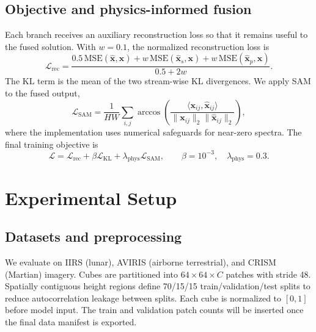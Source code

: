 \documentclass{article}
\newcommand{\sam}{\mathrm{SAM}}
\begin{document}
\subsection{Objective and physics-informed fusion}

Each branch receives an auxiliary reconstruction loss so that it remains useful to the fused solution. With $w=0.1$, the normalized reconstruction loss is
\begin{equation}
\mathcal{L}_{\mathrm{rec}}=
\frac{0.5\,\mathrm{MSE}(\hat{\mathbf{x}},\mathbf{x})+
w\,\mathrm{MSE}(\hat{\mathbf{x}}_s,\mathbf{x})+
w\,\mathrm{MSE}(\hat{\mathbf{x}}_p,\mathbf{x})}{0.5+2w}.
\end{equation}
The KL term is the mean of the two stream-wise KL divergences. We apply SAM to the fused output,
\begin{equation}
\mathcal{L}_{\sam}=\frac{1}{HW}\sum_{i,j}
\arccos\left(
\frac{\langle\mathbf{x}_{ij},\hat{\mathbf{x}}_{ij}\rangle}
{\lVert\mathbf{x}_{ij}\rVert_2\lVert\hat{\mathbf{x}}_{ij}\rVert_2}
\right),
\end{equation}
where the implementation uses numerical safeguards for near-zero spectra. The final training objective is
\begin{equation}
\mathcal{L}=\mathcal{L}_{\mathrm{rec}}+\beta\mathcal{L}_{\mathrm{KL}}+
\lambda_{\mathrm{phys}}\mathcal{L}_{\sam},
\qquad \beta=10^{-3},\quad\lambda_{\mathrm{phys}}=0.3.
\label{eq:objective}
\end{equation}

\section{Experimental Setup}

\subsection{Datasets and preprocessing}

We evaluate on IIRS (lunar), AVIRIS (airborne terrestrial), and CRISM (Martian) imagery. Cubes are partitioned into $64\times64\times C$ patches with stride 48. Spatially contiguous height regions define 70/15/15 train/validation/test splits to reduce autocorrelation leakage between splits. Each cube is normalized to $[0,1]$ before model input. The train and validation patch counts will be inserted once the final data manifest is exported.
\end{document}
